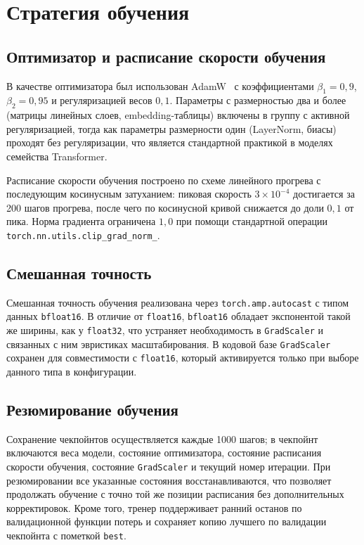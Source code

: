 \section{Стратегия обучения}

\subsection{Оптимизатор и расписание скорости обучения}

В качестве оптимизатора был использован
AdamW~\cite{loshchilovDecoupledWeightDecay2019} с коэффициентами
$\beta_1 = 0{,}9$, $\beta_2 = 0{,}95$ и регуляризацией весов $0{,}1$.
Параметры с размерностью два и более (матрицы линейных слоев,
embedding-таблицы) включены в группу с активной регуляризацией, тогда
как параметры размерности один (LayerNorm, биасы) проходят без
регуляризации, что является стандартной практикой в моделях семейства
Transformer.

Расписание скорости обучения построено по схеме линейного прогрева с
последующим косинусным затуханием: пиковая скорость $3 \times 10^{-4}$
достигается за 200 шагов прогрева, после чего по косинусной кривой
снижается до доли $0{,}1$ от пика. Норма градиента ограничена $1{,}0$
при помощи стандартной операции \texttt{torch.nn.utils.clip\_grad\_norm\_}.

\subsection{Смешанная точность}

Смешанная точность обучения реализована через \texttt{torch.amp.autocast}
с типом данных \texttt{bfloat16}. В отличие от \texttt{float16},
\texttt{bfloat16} обладает экспонентой такой же ширины, как у
\texttt{float32}, что устраняет необходимость в \texttt{GradScaler} и
связанных с ним эвристиках масштабирования. В кодовой базе
\texttt{GradScaler} сохранен для совместимости с \texttt{float16},
который активируется только при выборе данного типа в конфигурации.

\subsection{Резюмирование обучения}

Сохранение чекпойнтов осуществляется каждые 1000 шагов; в чекпойнт
включаются веса модели, состояние оптимизатора, состояние расписания
скорости обучения, состояние \texttt{GradScaler} и текущий номер
итерации. При резюмировании все указанные состояния восстанавливаются,
что позволяет продолжать обучение с точно той же позиции расписания
без дополнительных корректировок. Кроме того, тренер поддерживает
ранний останов по валидационной функции потерь и сохраняет копию
лучшего по валидации чекпойнта с пометкой \texttt{best}.

